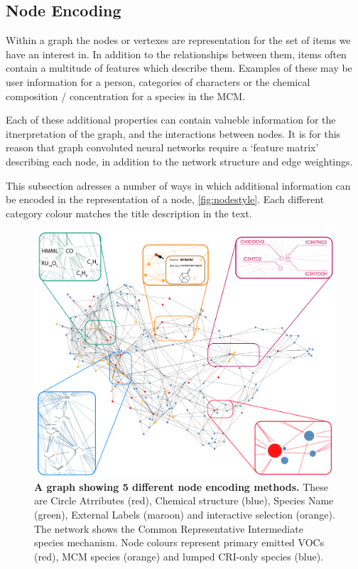 \subsection{Node Encoding}
Within a graph the nodes or vertexes are representation for the set of items we have an interest in. In addition to the relationships between them, items often contain a multitude of features which describe them. Examples of these may be user information for a person, categories of characters or the chemical composition / concentration for a species in the MCM.

Each of these additional properties can contain valueble information for the itnerpretation of the graph, and the interactions between nodes. It is for this reason that graph convoluted neural networks \citep{t2gcn} require a  `feature matrix' describing each node, in addition to the network structure and edge weightings. 

This subsection adresses a number of ways in which additional information can be encoded in the representation of a node, \autoref{fig:nodestyle}. Each different category colour matches the title description in the text. 


\begin{figure}[H]
     \centering
     \includegraphics[width=\textwidth]{figures_c1/NODES_001f3d-00775b-ff9000-f71735-c10053.pdf}
        \caption{\textbf{A graph showing 5 different node encoding methods.} These are Circle Atrributes (red), Chemical structure (blue), Species Name (green), External Labels (maroon) and interactive selection (orange). The network shows the Common Representative Intermediate species \citep{cri} mechanism. Node colours represent primary emitted VOCs (red), MCM species (orange) and lumped CRI-only species (blue).  }
      \label{fig:nodestyle}
\end{figure}





